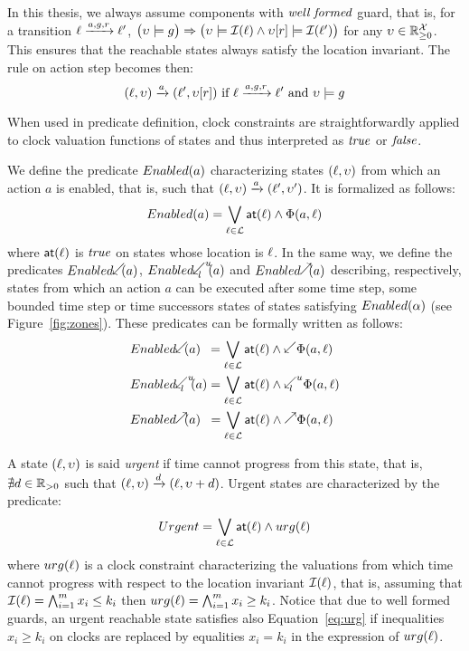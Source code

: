In this thesis, we always assume components with $\emph{well formed}$
guard, that is, for a transition $\ell\xrightarrow{a,g,r}\ell'$,
$\big(\upsilon\models g\big)\Rightarrow\big(\upsilon\models\mathcal{I}(\ell)\wedge\upsilon[r]\models
\mathcal{I}(\ell')\big)$ for any $\upsilon\in\mathbb{R}_{\ge 0}^{\mathcal{X}}$. This ensures that the reachable states
always satisfy the location invariant. The rule on action step becomes then:
\begin{displaymath}
  (\ell,\upsilon)\xrightarrow{a}(\ell',\upsilon[r])\text{ if } \ell\xrightarrow{a,g,r}
      \ell'\text{ and } \upsilon\models g 
\end{displaymath}
\begin{remark}
  When used in predicate definition, clock constraints are straightforwardly 
  applied to clock valuation functions of states and thus interpreted as $\textnormal{\textit{true}}$
  or $\textnormal{\textit{false}}$.
\end{remark}
We define the predicate $Enabled(a)$ characterizing states $(\ell,\upsilon)$
from which an action $a$ is enabled, that is, such that $(\ell,\upsilon)
\xrightarrow{a}(\ell',\upsilon')$. It is formalized as follows:
\begin{displaymath}
  Enabled(a)=\bigvee_{\ell\in\mathcal{L}}\textsf{at}(\ell)\wedge\Phi(a,\ell)
\end{displaymath}
where $\textsf{at}(\ell)$ is $\textnormal{\textit{true}}$ on states whose location is $\ell$.
In the same way, we define the predicates $\enabledbackward{a}$,
$\enabledbackwardb{a}{l}{u}$ and $\enabledforward{a}$ describing, respectively,
states from which an action $a$ can be executed after some time step,
some bounded time step or time successors states of states satisfying $Enabled(\alpha)$
(see Figure~\ref{fig:zones}). These predicates can be formally written 
as follows:
\begin{align*}
  &\enabledbackward{a}\hspace{1.8mm}=\bigvee_{\loc\in\Loc}\al{\loc}\wedge
  \backward\Phi(a,\loc)  \\
  &\enabledbackwardb{a}{l}{u}=\bigvee_{\loc\in\Loc}\al{\loc}\wedge
  \backwardp{l}{u}\Phi(a,\loc)\\
  &\enabledforward{a}\hspace{1.9mm}=\bigvee_{\loc\in\Loc}\al{\loc}\wedge
  \forward\Phi(a,\loc)
\end{align*}

A state $(\ell,\upsilon)$ is said \emph{urgent} if time cannot progress from
this state, that is, $\nexists d\in\mathbb{R}_{> 0}$ such that $(\ell,\upsilon)\xrightarrow{d}
(\ell,\upsilon+d)$. Urgent states are characterized by the predicate:
\begin{equation}\label{eq:urg}
  Urgent=\bigvee_{\ell\in\mathcal{L}}\textsf{at}(\ell)\wedge urg(\ell)
\end{equation}
where $urg(\ell)$ is a clock constraint characterizing the valuations from
which time cannot progress with respect to the location invariant 
$\mathcal{I}(\ell)$, that is, assuming that 
$\mathcal{I}(\ell)=\bigwedge_{i=1}^m x_i\le k_i$ then 
$urg(\ell)=\bigwedge_{i=1}^m x_i\ge k_i$. Notice that due to well formed
guards, an urgent reachable state satisfies also Equation~\ref{eq:urg} if inequalities
$x_i\ge k_i$ on clocks are replaced by equalities $x_i=k_i$ in the expression
of $urg(\ell)$.

